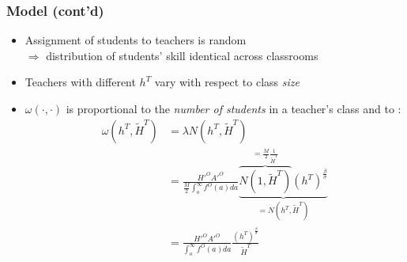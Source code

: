 \documentclass[11pt]{beamer}
\begin{document}
\begin{frame}
\frametitle{Model (cont'd)}
\begin{itemize}
  \item Assignment of students to teachers is random \\ $\Rightarrow$ distribution of students' skill identical across classrooms
  \item Teachers with different $h^T$ vary with respect to class {\it size}
  \item $\omega(\cdot,\cdot)$ is proportional to the \textit{number of students} in a teacher's class and to :
  \begin{align*}
\omega(h^T,\widetilde{H}^T) & = \lambda N(h^T,\widetilde{H}^T) \\
& = \frac{{H'}^O {A'}^O}{\frac{M}{2}\int_o^\infty f^O(a) da} \underbrace{\overbrace{N(1,\widetilde{H}^T)}^{=\frac{M}{2}\frac{1}{\widetilde{H}^T}}\left( h^T \right)^{\frac{\beta}{\sigma}}}_{=N(h^T,\widetilde{H}^T)} \\
& = \frac{{H'}^O {A'}^O}{\int_o^\infty f^O(a) da} \frac{\left( h^T \right)^{\frac{\beta}{\sigma}}}{{\widetilde{H}^T}}
\end{align*}
\end{itemize}

\end{frame}
\end{document}
